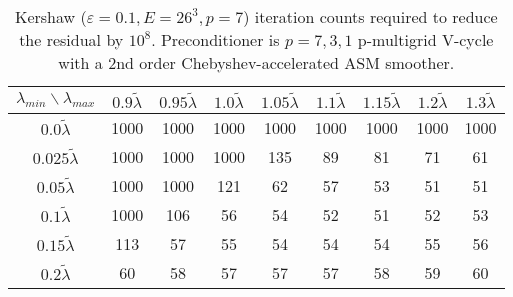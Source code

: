 \begin{table}
\centering
\begin{tabular}{||c| c c c c c c c c||}
  \hline
  $\lambda_{min}\backslash \lambda_{max}$ & $0.9 \tilde\lambda$ & $0.95 \tilde\lambda$ & $1.0 \tilde\lambda$ & $1.05 \tilde\lambda$ & $1.1 \tilde\lambda$ & $1.15 \tilde\lambda$ & $1.2 \tilde\lambda$ & $1.3 \tilde\lambda$  \\ 
\hline\hline
$0.0 \tilde\lambda$ & 1000 & 1000 & 1000 & 1000 & 1000 & 1000 & 1000 & 1000 \\ 
$0.025 \tilde\lambda$ & 1000 & 1000 & 1000 & 135 & 89 & 81 & 71 & 61 \\ 
$0.05 \tilde\lambda$ & 1000 & 1000 & 121 & 62 & 57 & 53 & 51 & 51 \\ 
$0.1 \tilde\lambda$ & 1000 & 106 & 56 & 54 & 52 & 51 & 52 & 53 \\ 
$0.15 \tilde\lambda$ & 113 & 57 & 55 & 54 & 54 & 54 & 55 & 56 \\ 
$0.2 \tilde\lambda$ & 60 & 58 & 57 & 57 & 57 & 58 & 59 & 60 \\ 
\hline
\end{tabular}
\caption{
  Kershaw ($\varepsilon=0.1, E=26^3, p=7$) iteration counts required to reduce the residual by $10^8$.
  Preconditioner is $p=7,3,1$ p-multigrid V-cycle with a 2nd order Chebyshev-accelerated ASM smoother.
  \label{table:kershaw-eig-multiplier-0.1}}
\end{table}
